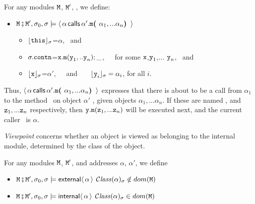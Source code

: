 \begin{definition}[%
Control]  \label{def:valid:assertion:control}
For any modules $\M$, $\M'$,  , we define$:$
\begin{itemize}
   \item
$\M\mkpair \M', \sigma_0 , \sigma \models  \Calls {\alpha}  {\prg{m}} {\alpha'}  {\alpha_1,...\alpha_n}$ \IFF \ \ \ 
\begin{itemize}
\item
$\interp{\prg{this}}{\sigma}$=$\alpha$, \ and
\item
$\sigma.\prg{contn}$=${\x.\m(\y_1,..\y_n);\_}$,\ \ \ for some  $\x$,$\y_1$,... $\y_n$, \ and
\item
 $\interp{\prg{x}}{\sigma}$=$\alpha'$,\ \ \ and \ \ \ 
  $\interp{{\prg{y}_i}}{\sigma}=\alpha_i$, for all  $i$.
 \end{itemize}
  \end{itemize}
\end{definition}

\noindent 
Thus, $\Calls {\alpha}  {\prg{m}} {\alpha'}  {{\alpha_1,...\alpha_n}}$ expresses that there is about to be a call from $\alpha_1$ to the method \m\ on object $\alpha'$ , given objects $\alpha_1,...\alpha_n$. If these are named \y, and $\z_1,...\z_n$ respectively, then $\y.\m(\z_1,...\z_n)$ will be executed next, and the current caller \this\ is $\alpha$.
 

\vspace{.2cm} \noindent
\textit{Viewpoint} concerns whether an object is viewed as belonging to the internal module, determined by the class of the object.

 \begin{definition}[%
Viewpoint]  \label{def:valid:assertion:view}
For any modules $\M$, $\M'$, and addresses $\alpha$, $\alpha'$, we define
\begin{itemize}
 \item
$\M\mkpair \M', \sigma_0 , \sigma \models \External {\alpha}$ 
  \IFF
 $\ClassOf {\alpha} {\sigma} \notin dom(\M)$
\item
$\M\mkpair \M',\sigma_0 ,  \sigma \models \Internal {\alpha}$ 
  \IFF
  $\ClassOf {\alpha} {\sigma} \in dom(\M)$
\end{itemize}
\end{definition}
\noindent 


